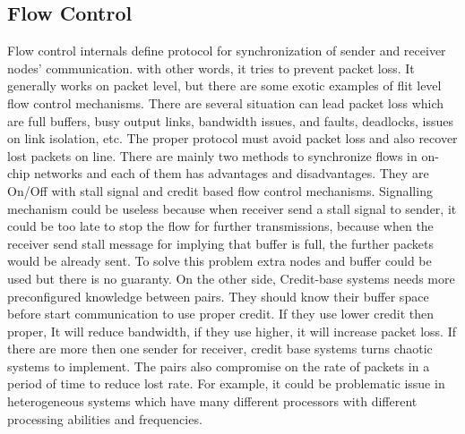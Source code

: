         \subsection{Flow Control}
        Flow control internals define protocol for synchronization of sender and receiver nodes' communication. with other words, it tries to prevent packet loss. It generally works on packet level, but there are some exotic examples of flit level flow control mechanisms. There are several situation can lead packet loss which are full buffers, busy output links, bandwidth issues, and faults, deadlocks, issues on link isolation, etc. The proper protocol must avoid packet loss and also recover lost packets on line. There are mainly two methods to synchronize flows in on-chip networks and each of them has advantages and disadvantages. They are On/Off with stall signal and credit based flow control mechanisms. Signalling mechanism could be useless because when receiver send a stall signal to sender, it could be too late to stop the flow for further transmissions, because when the receiver send stall message for implying that buffer is full, the further packets would be already sent. To solve this problem extra nodes and buffer could be used but there is no guaranty. On the other side, Credit-base systems needs more preconfigured knowledge between pairs. They should know their buffer space before start communication to use proper credit. If they use lower credit then proper, It will reduce bandwidth, if they use higher, it will increase packet loss. If there are more then one sender for receiver, credit base systems turns chaotic systems to implement. The pairs also compromise on the rate of packets in a period of time to reduce lost rate. For example, it could be problematic issue in heterogeneous systems which have many different processors with different processing abilities and frequencies.


